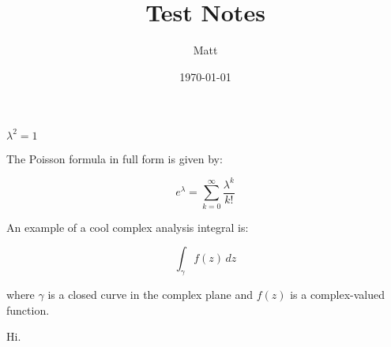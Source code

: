 \documentclass[12pt]{article}
\title{Test Notes}
\author{Matt}
\date{\today}
\begin{document}
\maketitle

\(\lambda^2 = 1\)

The Poisson formula in full form is given by:

\[e^{\lambda} = \sum_{k=0}^{\infty} \frac{\lambda^k}{k!}\]

An example of a cool complex analysis integral is:

\[\int_{\gamma} f(z) \, dz\]

where \(\gamma\) is a closed curve in the complex plane and \(f(z)\) is a complex-valued function.

Hi.
\end{document}
